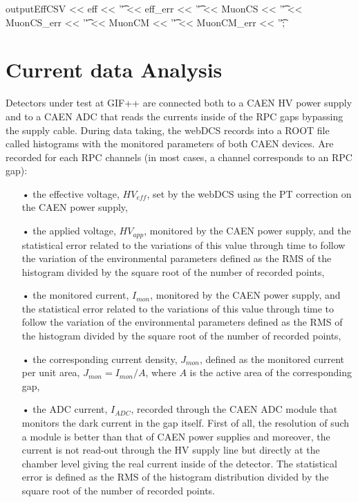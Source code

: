 \begin{code}
\begin{cppcode}
{{{			outputEffCSV << eff << '\t' << eff_err << '\t'
				<< MuonCS << '\t' << MuonCS_err << '\t'
				<< MuonCM << '\t' << MuonCM_err << '\t';
		}
	}
}
	\end{cppcode}
	\label{cpp:effcsv}
	\vspace{5mm}
	\end{code}

\clearpage{\pagestyle{empty}\cleardoublepage}

\section{Current data Analysis}
\label{app2:sec:currents}

	Detectors under test at GIF++ are connected both to a CAEN HV power supply and to a CAEN ADC that reads the currents inside of the RPC gaps bypassing the supply cable. During data taking, the webDCS records into a ROOT file called  histograms with the monitored parameters of both CAEN devices. Are recorded for each RPC channels (in most cases, a channel corresponds to an RPC gap):
	
	\begin{itemize}
		\item[•] the effective voltage, $HV_{eff}$, set by the webDCS using the PT correction on the CAEN power supply,
		\item[•] the applied voltage, $HV_{app}$, monitored by the CAEN power supply, and the statistical error related to the variations of this value through time to follow the variation of the environmental parameters defined as the RMS of the histogram divided by the square root of the number of recorded points,
		\item[•] the monitored current, $I_{mon}$, monitored by the CAEN power supply, and the statistical error related to the variations of this value through time to follow the variation of the environmental parameters defined as the RMS of the histogram divided by the square root of the number of recorded points,
		\item[•] the corresponding current density, $J_{mon}$, defined as the monitored current per unit area, $J_{mon} = I_{mon}/A$, where $A$ is the active area of the corresponding gap,
		\item[•] the ADC current, $I_{ADC}$, recorded through the CAEN ADC module that monitors the dark current in the gap itself. First of all, the resolution of such a module is better than that of CAEN power supplies and moreover, the current is not read-out through the HV supply line but directly at the chamber level giving the real current inside of the detector. The statistical error is defined as the RMS of the histogram distribution divided by the square root of the number of recorded points.
	\end{itemize}
	
